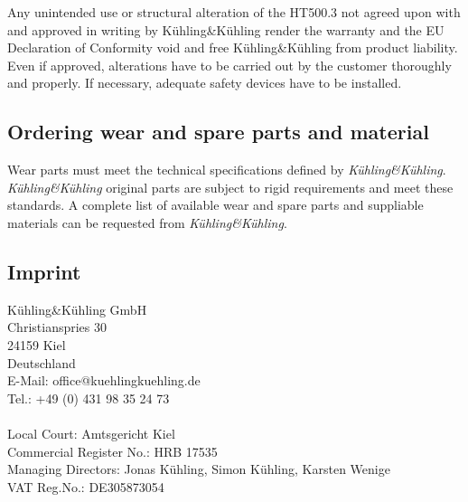\begin{info}
  Any unintended use or structural alteration of the HT500.3 not agreed upon with and approved in writing by Kühling\&Kühling render the warranty and the EU Declaration of Conformity void and free Kühling\&Kühling from product liability. Even if approved, alterations have to be carried out by the customer thoroughly and properly. If necessary, adequate safety devices have to be installed. 
\end{info}



\subsection{Ordering wear and spare parts and material}

Wear parts must meet the technical specifications defined by \emph{Kühling\&Kühling}. \emph{Kühling\&Kühling} original parts are subject to rigid requirements and meet these standards. A complete list of available wear and spare parts and suppliable materials can be requested from \emph{Kühling\&Kühling}. 



\subsection{Imprint}

Kühling\&Kühling GmbH\\
Christianspries 30\\
24159 Kiel\\
Deutschland\\
E-Mail: office@kuehlingkuehling.de\\
Tel.: +49 (0) 431 98 35 24 73\\
\\
Local Court: Amtsgericht Kiel\\
Commercial Register No.: HRB 17535\\
Managing Directors: Jonas Kühling, Simon Kühling, Karsten Wenige\\
VAT Reg.No.: DE305873054\\
